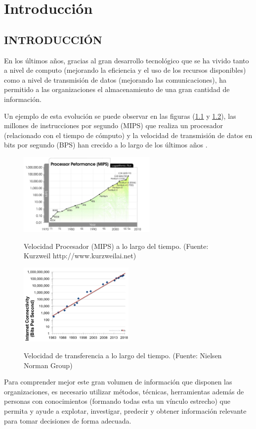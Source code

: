 \chapter{Introducción}
\section{INTRODUCCIÓN}
En los últimos años, gracias al gran desarrollo tecnológico que se ha vivido tanto a nivel de computo (mejorando la eficiencia y el uso de los recursos disponibles) como a nivel de transmisión de datos (mejorando las comunicaciones), ha permitido a las organizaciones el almacenamiento de una gran cantidad de información.

Un ejemplo de esta evolución se puede observar en las figuras (\ref{fig:procPerformance} y \ref{fig:bandwidth-growth}), las millones de instrucciones por segundo (MIPS) que realiza un procesador (relacionado con el tiempo de cómputo) y la velocidad de transmisión de datos en bits por segundo (BPS) han crecido a lo largo de los últimos años \cite{Nielsen2018}. 

\begin{figure}[htb]
	\centering
	\caption{Velocidad Procesador (MIPS) a lo largo del tiempo. (Fuente: Kurzweil http://www.kurzweilai.net)}
	\includegraphics[width=0.6\textwidth]{recursos/processor_performance}
	\label{fig:procPerformance}
\end{figure}
\FloatBarrier
\begin{figure}[htb]
	\centering
\caption{Velocidad de transferencia a lo largo del tiempo. (Fuente: Nielsen Norman Group)}
\includegraphics[width=0.5\textwidth]{recursos/bandwidth-growth-nielsen-law}
\label{fig:bandwidth-growth}
\end{figure}
\FloatBarrier
Para comprender mejor este gran volumen de información que disponen las organizaciones, es necesario utilizar métodos, técnicas, herramientas además de personas con conocimientos (formando todas esta un vínculo estrecho) que permita y ayude a explotar, investigar, predecir y obtener información relevante para tomar decisiones de forma adecuada.


